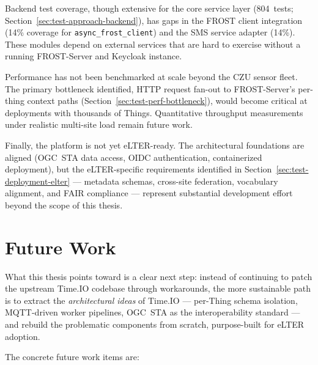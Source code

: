 Backend test coverage, though extensive for the core service
layer (804~tests; Section~\ref{sec:test-approach-backend}), has gaps in the FROST client integration
(14\% coverage for \texttt{async\_frost\_client}) and the SMS service adapter (14\%). These
modules depend on external services that are hard to exercise without a running
FROST-Server and Keycloak instance.

Performance has not been benchmarked at scale beyond the CZU sensor fleet. The primary
bottleneck identified, HTTP request fan-out to FROST-Server's per-thing context paths
(Section~\ref{sec:test-perf-bottleneck}), would become critical at deployments with
thousands of Things. Quantitative throughput measurements under realistic multi-site load
remain future work.

Finally, the platform is not yet eLTER-ready. The architectural foundations are aligned
(OGC~STA data access, OIDC authentication, containerized deployment), but the
eLTER-specific requirements identified in Section~\ref{sec:test-deployment-elter} ---
metadata schemas, cross-site federation, vocabulary alignment, and FAIR compliance ---
represent substantial development effort beyond the scope of this thesis.

\section*{Future Work}

What this thesis points toward is a clear next step: instead
of continuing to patch the upstream Time.IO codebase through workarounds, the more
sustainable path is to extract the \emph{architectural ideas} of Time.IO --- per-Thing schema
isolation, MQTT-driven worker pipelines, OGC~STA as the interoperability standard --- and
rebuild the problematic components from scratch, purpose-built for eLTER adoption.

The concrete future work items are:

